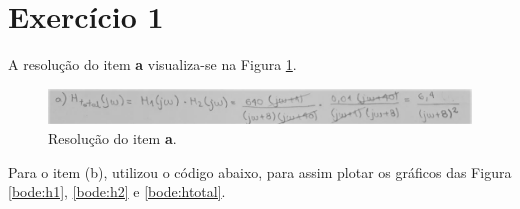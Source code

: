 \documentclass[a4paper,12pt,oneside,openany,table,xcdraw]{article}
\begin{document}
\newcommand{\thedepartment}{Faculdade de Engenharia Elétrica}
\newcommand{\thecourse}{FEELT}
\newcommand{\thetitle}{LISTA DE EXERCÍCIOS EXTRAS 1}
\newcommand{\thetype}{Relatório da Disciplina de Sinais e Sistemas 2}
\newcommand{\theproftitle}{Doutor em Engenharia Elétrica com ênfase em Telecomunicações}
\newcommand{\thestudent}{Lesly Viviane Montúfar Berrios\\
\centering11811ETE001}
\newcommand{\theadvisor}{Prof. Alan Petrônio Pinheiro}
\newcommand{\thecity}{Uberlândia}

\thispagestyle{empty}




\onehalfspacing
\tableofcontents %
\newpage

\section{Exercício 1}
A resolução do item \textbf{a} visualiza-se na Figura \ref{scan:1a}.

\begin{figure}[H]
\centering
\captionsetup{font=scriptsize}
\includegraphics[width=14.5cm]{1a}
\caption{Resolução do item \textbf{a}.}
\label{scan:1a}
\end{figure}

Para o item (b), utilizou o código abaixo, para assim plotar os gráficos das Figura \ref{bode:h1}, \ref{bode:h2} e \ref{bode:htotal}.

\end{document}
